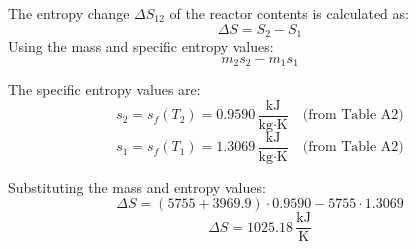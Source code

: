 The entropy change \( \Delta S_{12} \) of the reactor contents is calculated as:  
\[
\Delta S = S_2 - S_1
\]  
Using the mass and specific entropy values:  
\[
m_2 s_2 - m_1 s_1
\]  

The specific entropy values are:  
\[
s_2 = s_f(T_2) = 0.9590 \, \frac{\text{kJ}}{\text{kg·K}} \quad \text{(from Table A2)}
\]  
\[
s_1 = s_f(T_1) = 1.3069 \, \frac{\text{kJ}}{\text{kg·K}} \quad \text{(from Table A2)}
\]  

Substituting the mass and entropy values:  
\[
\Delta S = (5755 + 3969.9) \cdot 0.9590 - 5755 \cdot 1.3069
\]  
\[
\Delta S = 1025.18 \, \frac{\text{kJ}}{\text{K}}
\]